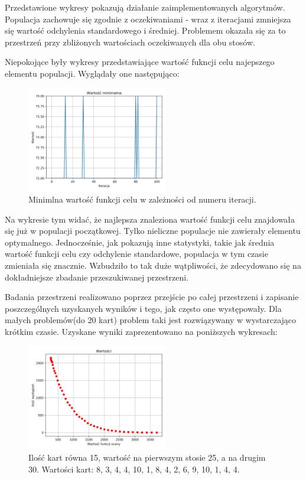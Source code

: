 \documentclass[12pt]{article}
\begin{document}
Przedstawione wykresy pokazują działanie zaimplementowanych algorytmów. Populacja zachowuje się zgodnie z oczekiwaniami - wraz z iteracjami zmniejsza się wartość odchylenia standardowego i średniej. Problemem okazała się za to przestrzeń przy zbliżonych wartościach oczekiwanych dla obu stosów.

Niepokojące były wykresy przedstawiające wartość fukncji celu najepszego elementu populacji. Wyglądały one następująco:
\begin{figure}[H]
	\centering					\includegraphics[width=0.55\textwidth]{two_group.png}
	\caption{Minimlna wartość funkcji celu w zależności od numeru iteracji.}
	\label{fig1}
\end{figure}

Na wykresie tym widać, że najlepsza znaleziona wartość funkcji celu znajdowała się już w populacji początkowej. Tylko nieliczne populacje nie zawierały elementu optymalnego. Jednocześnie, jak pokazują inne statystyki, takie jak średnia wartość funkcji celu czy odchylenie standardowe, populacja w tym czasie zmieniała się znacznie. Wzbudziło to tak duże wątpliwości, że zdecydowano się na dokładniejsze zbadanie przeszukiwanej przestrzeni.

Badania przestrzeni realizowano poprzez przejście po całej przestrzeni i zapisanie poszczególnych uzyskanych wyników i tego, jak często one występowały. Dla małych problemów(do 20 kart) problem taki jest rozwiązywany w wystarczająco krótkim czasie. Uzyskane wyniki zaprezentowano na poniższych wykresach:

\begin{figure}[h]
	\centering					\includegraphics[width=0.55\textwidth]{1Values.png}
	\caption{Ilość kart równa 15, wartość na pierwszym stosie 25, a na drugim 30. Wartości kart: 8, 3, 4, 4, 10, 1, 8, 4, 2, 6, 9, 10, 1, 4, 4.}
	\label{fig1}
\end{figure}
\end{document}
